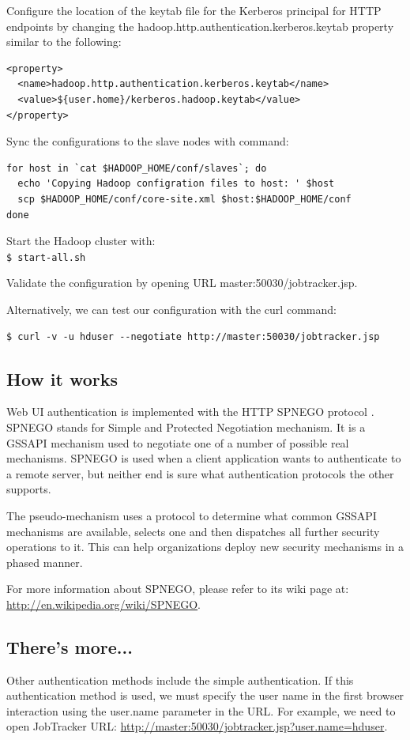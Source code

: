 Configure the location of the keytab file for the Kerberos principal for HTTP endpoints by changing the hadoop.http.authentication.kerberos.keytab property similar to the following:
\lstset{style=bashstyle}
\begin{lstlisting}
<property>
  <name>hadoop.http.authentication.kerberos.keytab</name>
  <value>${user.home}/kerberos.hadoop.keytab</value>
</property>
\end{lstlisting}

Sync the configurations to the slave nodes with command:
\begin{verbatim}
for host in `cat $HADOOP_HOME/conf/slaves`; do
  echo 'Copying Hadoop configration files to host: ' $host
  scp $HADOOP_HOME/conf/core-site.xml $host:$HADOOP_HOME/conf
done
\end{verbatim}

Start the Hadoop cluster with: \\
\verb|$ start-all.sh|

Validate the configuration by opening URL master:50030/jobtracker.jsp.

Alternatively, we can test our configuration with the curl command:
\lstset{style=bashstyle}
\begin{lstlisting}$ curl -v -u hduser --negotiate http://master:50030/jobtracker.jsp 
\end{lstlisting}

\subsection*{How it works}
Web UI authentication is implemented with the HTTP SPNEGO protocol . SPNEGO stands for Simple and Protected Negotiation mechanism. It is a GSSAPI mechanism used to negotiate one of a number of possible real mechanisms. SPNEGO is used when a client application wants to authenticate to a remote server, but neither end is sure what authentication protocols the other supports.

The pseudo-mechanism uses a protocol to determine what common GSSAPI mechanisms are available, selects one and then dispatches all further security operations to it. This can help organizations deploy new security mechanisms in a phased manner.

For more information about SPNEGO, please refer to its wiki page at: \url{http://en.wikipedia.org/wiki/SPNEGO}.

\subsection*{There's more...}
Other authentication methods include the simple authentication. If this authentication method is used, we must specify the user name in the first browser interaction using the user.name parameter in the URL. For example, we need to open JobTracker URL: \url{http://master:50030/jobtracker.jsp?user.name=hduser}.

